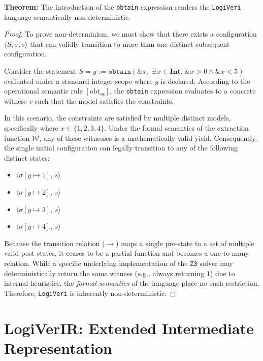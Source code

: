 \documentclass{article}
\begin{document}
\textbf{Theorem:} The introduction of the \texttt{obtain} expression renders the \texttt{LogiVeri} language semantically non-deterministic.

\begin{proof}
To prove non-determinism, we must show that there exists a configuration $\langle S, \sigma, s \rangle$ that can validly transition to more than one distinct subsequent configuration.

Consider the statement $S = y \texttt{ := } \mathtt{obtain}(\texttt{\&}x,\; \exists\, x \in \textbf{Int}.\; \texttt{\&}x > 0 \land \texttt{\&}x < 5)$ evaluated under a standard integer scope where $y$ is declared. According to the operational semantic rule $[\text{obt}_{\text{os}}]$, the \texttt{obtain} expression evaluates to a concrete witness $v$ such that the model satisfies the constraints.

In this scenario, the constraints are satisfied by multiple distinct models, specifically where $x \in \{1, 2, 3, 4\}$. Under the formal semantics of the extraction function $\mathcal{W}$, any of these witnesses is a mathematically valid yield. Consequently, the single initial configuration can legally transition to any of the following distinct states:
\begin{itemize}
    \item $\langle \sigma[y \mapsto 1],\, s \rangle$
    \item $\langle \sigma[y \mapsto 2],\, s \rangle$
    \item $\langle \sigma[y \mapsto 3],\, s \rangle$
    \item $\langle \sigma[y \mapsto 4],\, s \rangle$
\end{itemize}

Because the transition relation ($\rightarrow$) maps a single pre-state to a set of multiple valid post-states, it ceases to be a partial function and becomes a one-to-many relation. While a specific underlying implementation of the $\mathtt{Z3}$ solver may deterministically return the same witness (e.g., always returning $1$) due to internal heuristics, the \textit{formal semantics} of the language place no such restriction. Therefore, \texttt{LogiVeri} is inherently non-deterministic.
\end{proof}

\newpage
\section{LogiVerIR: Extended Intermediate Representation}
\end{document}
